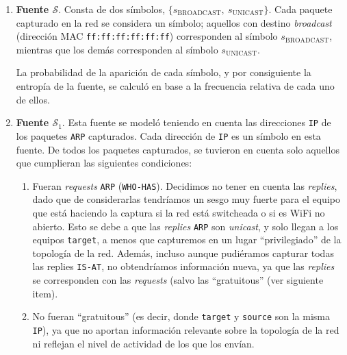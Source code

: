 \begin{enumerate}
    \item \textbf{Fuente $\mathcal{S}$}. Consta de dos símbolos, $\lbrace
    s_{\text{BROADCAST}},\ s_{\text{UNICAST}} \rbrace$. Cada paquete
    capturado en la red se considera un símbolo; aquellos con destino
    \emph{broadcast} (dirección MAC \texttt{ff:ff:ff:ff:ff:ff}) corresponden
    al símbolo $s_{\text{BROADCAST}}$, mientras que los demás corresponden
    al símbolo $s_{\text{UNICAST}}$.

    La probabilidad de la aparición de cada símbolo, y por consiguiente
    la entropía de la fuente, se calculó en base a la frecuencia relativa
    de cada uno de ellos.

    \item \textbf{Fuente $\mathcal{S}_1$}. Esta fuente se modeló teniendo en
    cuenta las direcciones \texttt{IP} de los paquetes \texttt{ARP}
    capturados. Cada dirección de \texttt{IP} es un símbolo en esta fuente. De
    todos los paquetes capturados, se tuvieron en cuenta solo aquellos que
    cumplieran las siguientes condiciones:
    \begin{enumerate}
        \item Fueran \emph{requests} \texttt{ARP} (\texttt{WHO-HAS}).
        Decidimos no tener en cuenta las \emph{replies}, dado que de
        considerarlas tendríamos un sesgo muy fuerte para el equipo que está
        haciendo la captura si la red está switcheada o si es WiFi no abierto.
        Esto se debe a que las \emph{replies} \texttt{ARP} son \emph{unicast},
        y solo llegan a los equipos \texttt{target}, a menos que capturemos en
        un lugar ``privilegiado'' de la topología de la red. Además, incluso
        aunque pudiéramos capturar todas las replies \texttt{IS-AT}, no
        obtendríamos información nueva, ya que las \emph{replies} se
        corresponden con las \emph{requests} (salvo las ``gratuitous'' (ver
        siguiente item).
        \item No fueran ``gratuitous'' (es decir, donde \texttt{target} y
        \texttt{source} son la misma \texttt{IP}), ya que no aportan
        información relevante sobre la topología de la red ni reflejan el
        nivel de actividad de los que los envían.
    \end{enumerate}


\end{enumerate}
